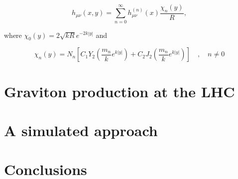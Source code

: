 \documentclass[11pt,a4paper]{article}
\begin{document}
\begin{equation}
	h_{\mu\nu}(x,y) = \sum_{n=0}^{\infty} h_{\mu\nu}^{(n)}(x)\frac{\chi_n(y)}{R},
\end{equation}

where $\chi_0(y) = 2\sqrt{kR}e^{-2k|y|}$ and

\begin{equation}
	\chi_n(y) = N_n\left[ C_1Y_2\left(\frac{m_n}{k}e^{k|y|}\right) +   C_2J_2\left(\frac{m_n}{k}e^{k|y|}\right)\right] \quad,\quad n\neq 0
\end{equation}



\section{Graviton production at the LHC}


\section{A simulated approach}


\section{Conclusions}
\end{document}
